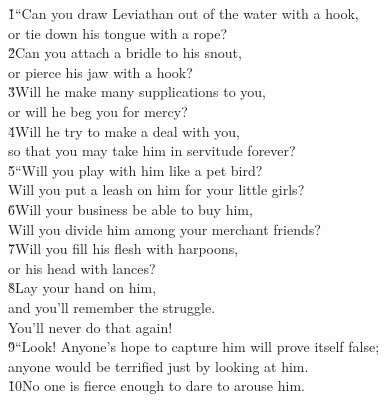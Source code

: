 \begin{poetry}
\poemll    {}
\v{1}``Can you draw Leviathan out of the water with a hook, \\
\poemll    or tie down his tongue with a rope? \\
\poeml \v{2}Can you attach a bridle to his snout, \\
\poemll    or pierce his jaw with a hook? \\
\poeml \v{3}Will he make many supplications to you, \\
\poemll    or will he beg you for mercy? \\
\poeml \v{4}Will he try to make a deal with you, \\
\poemll    so that you may take him in servitude forever? \\
\poeml \v{5}``Will you play with him like a pet bird? \\
\poemll    Will you put a leash on him for your little girls? \\
\poeml \v{6}Will your business be able to buy him, \\
\poemll    Will you divide him among your merchant friends? \\
\poeml \v{7}Will you fill his flesh with harpoons, \\
\poemll    or his head with lances? \\
\poeml \v{8}Lay your hand on him, \\
\poemll    and you'll remember the struggle. \\
\poemlll       You'll never do that again! \\
\poeml \v{9}``Look! Anyone's hope to capture him will prove itself false; \\
\poemll    anyone would be terrified just by looking at him. \\
\poeml \v{10}No one is fierce enough to dare to arouse him.
\end{poetry}

